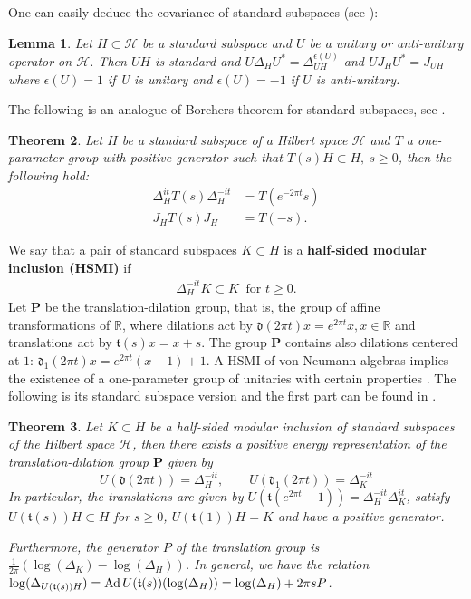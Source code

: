 \documentclass[12pt]{article}
\def\RR{{\mathbb R}}
\def\H{{\mathcal H}}
\def\Ad{{\hbox{\rm Ad\,}}}
\newtheorem{theorem}{Theorem}[section]
\newtheorem{lemma}[theorem]{Lemma}
\theoremstyle{remark}
\begin{document}
One can easily deduce the covariance of standard subspaces (see \cite[Lemma 2.2]{Morinelli18}):
\begin{lemma}\label{lem:cov}
Let $H\subset\H$ be a standard subspace and $U$ be a unitary or anti-unitary operator on $\H$. Then $UH$ is standard and $U\Delta_HU^*=\Delta_{UH}^{\epsilon(U)}$ and $UJ_HU^*=J_{UH}$ where $\epsilon(U)=1$ if U is unitary and $\epsilon(U)=-1$ if $U$ is anti-unitary.
\end{lemma}


The following is an analogue of Borchers theorem \cite{Borchers92, Florig98} for standard subspaces,
see \cite[Theorem 3.15]{Longo08}.
\begin{theorem}\label{th:borchersss}
Let $H$ be a standard subspace of a Hilbert space $\H$ and $T$ a one-parameter group with positive generator
such that $T(s)H\subset H, \ s\geq 0$, then the following hold:
\begin{align*}
\Delta_H^{it}T(s)\Delta_H^{-it}&=T(e^{-2\pi t}s)\\
J_H T(s) J_H &= T(-s).
\end{align*}
\end{theorem}

We say that a pair of standard subspaces $K\subset H$ is a \textbf{half-sided modular inclusion (HSMI)} if
\begin{align*}
\Delta_{H}^{-it}K\subset K \ \text{ for } t\geq 0.
\end{align*}
Let $\mathbf{P}$ be the translation-dilation group, that is, the group of affine transformations of $\RR$,
where dilations act by
$\mathfrak{d}(2\pi t) x=e^{2\pi t}x, x \in \RR$
and translations act by
$\mathfrak{t}(s) x = x + s$. The group $\mathbf{P}$ contains also dilations centered at $1$:
$\mathfrak{d}_1(2\pi t)x=e^{2\pi t}(x-1)+1$.
A HSMI of von Neumann algebras implies the existence of a one-parameter group of unitaries with certain properties \cite{Wiesbrock93-1, AZ05}.
The following is its standard subspace version and the first part can be found in \cite[Theorem 3.21]{Longo08}.
\begin{theorem}\label{theorem-1-standard}
Let $K\subset H$ be a half-sided modular inclusion of standard subspaces of the Hilbert space $\H$, then there exists a positive energy representation of the translation-dilation group $\mathbf{P}$ given by
\[
 U(\mathfrak{d}(2\pi t))=\Delta_H^{-it},\qquad U(\mathfrak{d}_1(2\pi t))=\Delta_K^{-it} 
\]
In particular, the translations are given by
$U(\mathfrak{t}(e^{2\pi t}-1))=\Delta_H^{-it}\Delta_K^{it}$, satisfy $U(\mathfrak{t}(s))H\subset H$ for $s\geq 0$,  $U(\mathfrak{t}(1))H=K$ and
have a positive generator.

Furthermore, the generator $P$ of the translation group is $\frac{1}{2\pi}\left(\log(\Delta_K)- \log(\Delta_H) \right)$.
In general, we have the relation $\log(\Delta_{U(\mathfrak{t}(s))H}) = \Ad U(\mathfrak{t}(s))(\log(\Delta_H)) = \log(\Delta_H) + 2\pi sP$.
\end{theorem}
\end{document}
